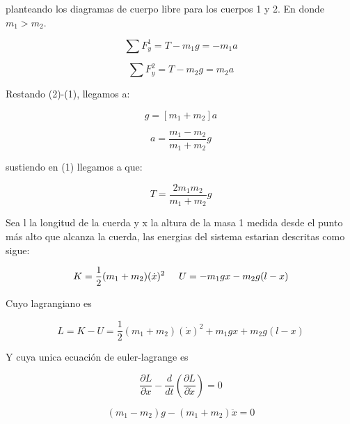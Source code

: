 \documentclass[12 pt]{article}
\begin{document}
planteando los diagramas de cuerpo libre para los cuerpos 1 y 2. En donde $m_{1} >m_{2}$.




\begin{equation}
\sum F_{y}^{1}= T-m_{1}g =- m_{1}a 
\end{equation}

\begin{equation}
\sum F_{y}^{2}= T-m_{2}g = m_{2}a 
\end{equation}


Restando (2)-(1), llegamos a:

\begin{equation*}
[m_{1} - m_{2}]g = [m_{1} + m_{2}] a
\end{equation*}


\begin{equation}
a = \frac{m_{1} - m_{2}}{m_{1} + m_{2}} g
\end{equation}


sustiendo en (1) llegamos a que: 

$$ T = \frac{2m_{1}m_{2}}{m_{1}+m_{2}}g $$



Sea l la longitud de la cuerda y x la altura de la masa 1 medida desde el punto más alto que alcanza la cuerda, las energias del sistema estarian descritas como sigue:

\begin{equation*}
K = \frac{1}{2} (m_{1}+m_{2}) (\dot{x})^{2} \hspace{0.5cm} U= -m_{1}gx-m_{2}g(l-x)
\end{equation*}

Cuyo lagrangiano es


\begin{equation*}
L = K-U = \frac{1}{2} (m_{1}+m_{2}) (\dot{x})^{2} +m_{1}gx +m_{2}g(l-x)
\end{equation*}

Y cuya unica ecuación de euler-lagrange es

\begin{equation*}
\frac{\partial L}{\partial x} - \frac{d}{dt} \left( \frac{\partial L}{\partial \dot{x}}\right) = 0
\end{equation*}

\begin{equation*}
(m_{1}-m_{2})g - (m_{1}+m_{2}) \ddot{x}= 0
\end{equation*}
\end{document}
